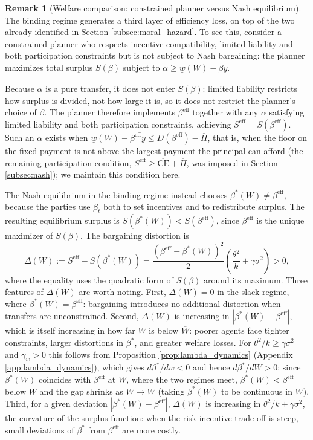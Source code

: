 \documentclass{article}
\theoremstyle{definition}
\newtheorem{remark}{Remark}[section]
\theoremstyle{plain}
\begin{document}
\begin{remark}[Welfare comparison: constrained planner versus Nash equilibrium]\label{rem:welfare}
The binding regime generates a third layer of efficiency loss, on top of the two already identified in Section \ref{subsec:moral_hazard}. To see this, consider a constrained planner who respects incentive compatibility, limited liability and both participation constraints but is not subject to Nash bargaining: the planner maximizes total surplus $S(\beta)$ subject to $\alpha \geq \underline{w}(W) - \beta\underline{y}$.

Because $\alpha$ is a pure transfer, it does not enter $S(\beta)$: limited liability restricts how surplus is divided, not how large it is, so it does not restrict the planner's choice of $\beta$. The planner therefore implements $\beta^{\mathrm{eff}}$ together with any $\alpha$ satisfying limited liability and both participation constraints, achieving $S^{\mathrm{eff}} = S(\beta^{\mathrm{eff}})$. Such an $\alpha$ exists when $\underline{w}(W) - \beta^{\mathrm{eff}}\underline{y} \le D(\beta^{\mathrm{eff}}) - \overline{\Pi}$, that is, when the floor on the fixed payment is not above the largest payment the principal can afford (the remaining participation condition, $S^{\mathrm{eff}} \ge \overline{\text{CE}} + \overline{\Pi}$, was imposed in Section \ref{subsec:nash}); we maintain this condition here.

The Nash equilibrium in the binding regime instead chooses $\beta^*(W) \neq \beta^{\mathrm{eff}}$, because the parties use $\beta_t$ both to set incentives and to redistribute surplus. The resulting equilibrium surplus is $S(\beta^*(W)) < S(\beta^{\mathrm{eff}})$, since $\beta^{\mathrm{eff}}$ is the unique maximizer of $S(\beta)$. The bargaining distortion is
\[
\Delta(W) := S^{\mathrm{eff}} - S(\beta^*(W)) = \frac{(\beta^{\mathrm{eff}} - \beta^*(W))^2}{2} \left(\frac{\theta^2}{k} + \gamma\sigma^2\right) > 0,
\]
where the equality uses the quadratic form of $S(\beta)$ around its maximum. Three features of $\Delta(W)$ are worth noting. First, $\Delta(W) = 0$ in the slack regime, where $\beta^*(W) = \beta^{\mathrm{eff}}$: bargaining introduces no additional distortion when transfers are unconstrained. Second, $\Delta(W)$ is increasing in $|\beta^*(W) - \beta^{\mathrm{eff}}|$, which is itself increasing in how far $W$ is below $\overline{W}$: poorer agents face tighter constraints, larger distortions in $\beta^*$, and greater welfare losses. For $\theta^2/k \ge \gamma\sigma^2$ and $\gamma_w>0$ this follows from Proposition \ref{prop:lambda_dynamics} (Appendix \ref{app:lambda_dynamics}), which gives $d\beta^*/d\underline{w}<0$ and hence $d\beta^*/dW>0$; since $\beta^*(W)$ coincides with $\beta^{\mathrm{eff}}$ at $\overline{W}$, where the two regimes meet, $\beta^*(W)<\beta^{\mathrm{eff}}$ below $\overline{W}$ and the gap shrinks as $W \to \overline{W}$ (taking $\beta^*(W)$ to be continuous in $W$). Third, for a given deviation $|\beta^*(W) - \beta^{\mathrm{eff}}|$, $\Delta(W)$ is increasing in $\theta^2/k + \gamma\sigma^2$, the curvature of the surplus function: when the risk-incentive trade-off is steep, small deviations of $\beta^*$ from $\beta^{\mathrm{eff}}$ are more costly.


\end{remark}
\end{document}
